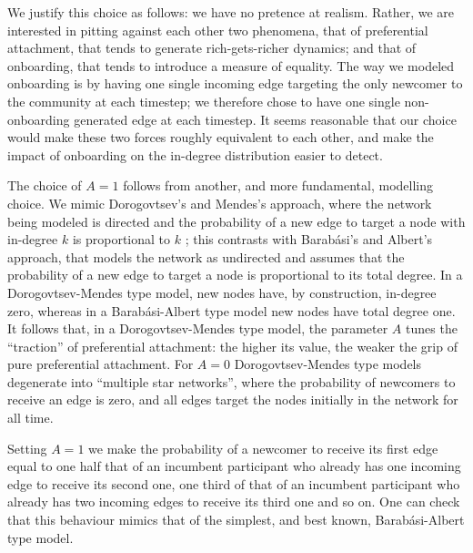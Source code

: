 \documentclass{article}
\begin{document}
We justify this choice as follows: we have no pretence at realism. Rather, we are interested in pitting against each other two phenomena, that of preferential attachment, that tends to generate rich-gets-richer dynamics; and that of onboarding, that tends to introduce a measure of equality. The way we modeled onboarding is by having one single incoming edge targeting the only newcomer to the community at each timestep; we therefore chose to have one single non-onboarding generated edge at each timestep. It seems reasonable that our choice would make  these two forces roughly equivalent to each other, and make the impact of onboarding on the in-degree distribution easier to detect. 


The choice of $A=1$ follows from another, and more fundamental, modelling choice. We mimic Dorogovtsev's and Mendes's approach, where the network being modeled is directed and the probability of a new edge to target a node with in-degree $k$ is proportional to $k$ \cite{dorogovtsev2002evolution}; this contrasts with Barab\'asi's and Albert's approach, that models the network as undirected and assumes that the probability of a new edge to target a node is proportional to its total degree. In a Dorogovtsev-Mendes type model, new nodes have, by construction, in-degree zero, whereas in a Barab\'asi-Albert type model new nodes have total degree one. It follows that, in a Dorogovtsev-Mendes type model, the parameter $A$ tunes the ``traction'' of preferential attachment: the higher its value, the weaker the grip of pure preferential attachment. For $A=0$ Dorogovtsev-Mendes type models degenerate into ``multiple star networks'', where the probability of newcomers to receive an edge is zero, and all edges target the nodes initially in the network for all time. 

Setting $A = 1$ we make the probability of a newcomer to receive its first edge equal to one half that of an incumbent participant who already has one incoming edge to receive its second one, one third of that of an incumbent participant who already has two incoming edges to receive its third one and so on. One can check that this behaviour mimics that of the simplest, and best known, Barab\'asi-Albert type model. 





\label{lastpage}
\end{document}
